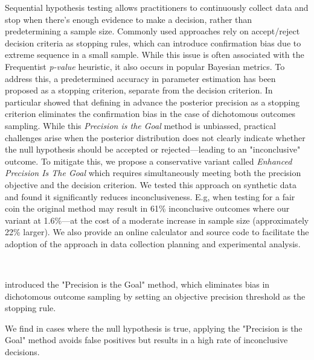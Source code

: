 Sequential hypothesis testing allows practitioners to continuously collect data and stop
when there's enough evidence to make a decision, rather than predetermining a sample
size.
Commonly used approaches rely on accept/reject decision criteria as stopping rules,
which can introduce confirmation bias due to extreme sequence in a small sample.
While this issue is often associated with the Frequentist {\it p-value} heuristic,
it also occurs in popular Bayesian metrics.
To address this, a predetermined accuracy in parameter estimation has been proposed
as a stopping criterion, separate from the decision criterion.
In particular \cite{kruschke2015doing} showed that defining in advance the
posterior precision as a stopping criterion eliminates the confirmation bias in the
case of dichotomous outcomes sampling.
While this {\it Precision is the Goal} method is unbiassed,
practical challenges arise when the posterior distribution does not clearly indicate
whether the null hypothesis should be accepted or rejected—leading to an "inconclusive"
outcome.
To mitigate this, we propose a conservative variant called
{\it Enhanced Precision Is The Goal} which requires simultaneously meeting both the
precision objective and the decision criterion.
We tested this approach on synthetic data and found it significantly reduces
inconclusiveness. E.g, when testing for a fair coin the original method may result in 61\%
inconclusive outcomes where our variant at 1.6\%—at the cost of a moderate increase in sample
size (approximately 22\% larger).
We also provide an online calculator and source code to facilitate the adoption of the
approach in data collection planning and experimental analysis.


\
\

\cite{kruschke2015doing} introduced the "Precision is the Goal" method,
which eliminates bias in dichotomous outcome sampling by setting an objective precision threshold as the stopping rule.

We find in cases where the null hypothesis is true,
applying the "Precision is the Goal" method avoids false positives but results in a high rate of inconclusive decisions.


\
\


